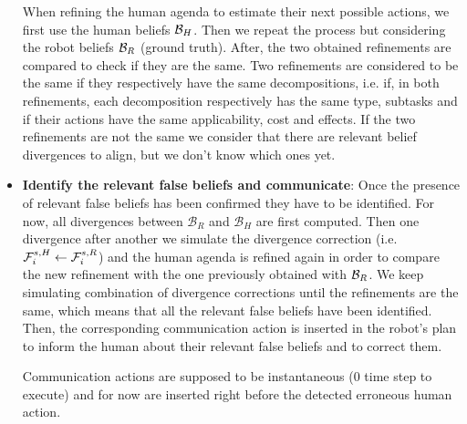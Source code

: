\documentclass[letterpaper]{article} %
\begin{document}
\begin{itemize}
    When refining the human agenda to estimate their next possible actions, we first use the human beliefs $\mathcal{B}_H$. Then we repeat the process but considering the robot beliefs $\mathcal{B}_R$ (ground truth). After, the two obtained refinements are compared to check if they are the same. Two refinements are considered to be the same if they respectively have the same decompositions, i.e. if, in both refinements, each decomposition respectively has the same type, subtasks and if their actions have the same applicability, cost and effects. If the two refinements are not the same we consider that there are relevant belief divergences to align, but we don't know which ones yet.
    
    \item \textbf{Identify the relevant false beliefs and communicate}: 
    Once the presence of relevant false beliefs has been confirmed they have to be identified. For now, all divergences between $\mathcal{B}_R$ and $\mathcal{B}_H$ are first computed. Then one divergence after another we simulate the divergence correction (i.e. $ \mathcal{F}^{s,H}_{i} \gets \mathcal{F}^{s,R}_{i}$) and the human agenda is refined again in order to compare the new refinement with the one previously obtained with $\mathcal{B}_R$. We keep simulating combination of divergence corrections until the refinements are the same, which means that all the relevant false beliefs have been identified. Then, the corresponding communication action is inserted in the robot's plan to inform the human about their relevant false beliefs and to correct them.
    
    Communication actions are supposed to be instantaneous (0 time step to execute) and for now are inserted right before the detected erroneous human action.
    
\end{itemize}
\end{document}
